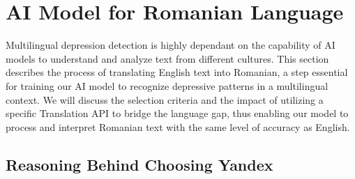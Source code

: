 \chapter{AI Model for Romanian Language}
\label{chap:ch3}
\par \quad Multilingual depression detection is highly dependant on the capability of AI models to understand and analyze text from different cultures. This section describes the process of translating English text into Romanian, a step essential for training our AI model to recognize depressive patterns in a multilingual context. We will discuss the selection criteria and the impact of utilizing a specific Translation API to bridge the language gap, thus enabling our model to process and interpret Romanian text with the same level of accuracy as English. 

\section{Reasoning Behind Choosing Yandex}

